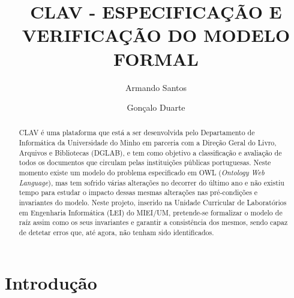\documentclass[tikz,runningheads,a4paper]{llncs}
\begin{document}
%
\title{CLAV - ESPECIFICAÇÃO E VERIFICAÇÃO DO MODELO FORMAL}
%
%
\author{Armando Santos \and
Gonçalo Duarte}

%
%
%
\maketitle              %
%
\begin{abstract}

CLAV é uma plataforma que está a ser desenvolvida pelo Departamento de Informática da Universidade do Minho em parceria com a Direção Geral do Livro, Arquivos e Bibliotecas (DGLAB), e tem como objetivo a classificação e avaliação de todos os documentos que circulam pelas instituições públicas portuguesas. Neste momento existe um modelo do problema especificado em OWL (\textit{Ontology Web Language}), mas tem sofrido várias alterações no decorrer do último ano e não existiu tempo para estudar o impacto dessas mesmas alterações nas pré-condições e invariantes do modelo. Neste projeto, inserido na Unidade Curricular de Laboratórios em Engenharia Informática (LEI) do MIEI/UM, pretende-se formalizar o modelo de raíz assim como os seus invariantes e garantir a consistência dos mesmos, sendo capaz de detetar erros que, até agora, não tenham sido identificados.

\end{abstract}
%
%
%
\section{Introdução}
\end{document}

